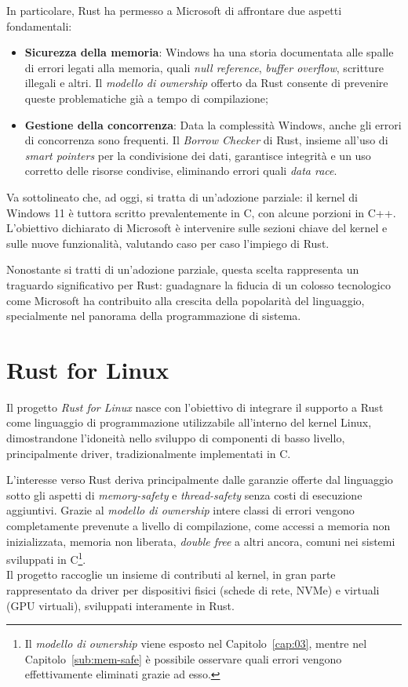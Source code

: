 In particolare, Rust ha permesso a Microsoft di affrontare due aspetti fondamentali:
\begin{itemize}
    \item \textbf{Sicurezza della memoria}: Windows ha una storia documentata alle spalle di errori legati alla memoria, quali \textit{null reference}, \textit{buffer overflow}, scritture illegali e altri. Il \textit{modello di ownership} offerto da Rust consente di prevenire queste problematiche già a tempo di compilazione;
    \item \textbf{Gestione della concorrenza}: Data la complessità Windows, anche gli errori di concorrenza sono frequenti. Il \textit{Borrow Checker} di Rust, insieme all'uso di \textit{smart pointers} per la condivisione dei dati, garantisce integrità e un uso corretto delle risorse condivise, eliminando errori quali \textit{data race}.
\end{itemize}
Va sottolineato che, ad oggi, si tratta di un'adozione parziale: il kernel di Windows 11 è tuttora scritto prevalentemente in C, con alcune porzioni in C++.
L'obiettivo dichiarato di Microsoft è intervenire sulle sezioni chiave del kernel e sulle nuove funzionalità, valutando caso per caso l'impiego di Rust.

Nonostante si tratti di un'adozione parziale, questa scelta rappresenta un traguardo significativo per Rust: guadagnare la fiducia
di un colosso tecnologico come Microsoft ha contribuito alla crescita della popolarità del linguaggio, specialmente nel panorama della programmazione di sistema.

\section{Rust for Linux}
Il progetto \textit{Rust for Linux} nasce con l'obiettivo di integrare il supporto a Rust 
come linguaggio di programmazione utilizzabile all'interno del kernel Linux, dimostrandone l'idoneità nello 
sviluppo di componenti di basso livello, principalmente driver, tradizionalmente 
implementati in C.

L'interesse verso Rust deriva principalmente dalle garanzie offerte dal linguaggio sotto gli aspetti di \textit{memory-safety} e \textit{thread-safety} senza
costi di esecuzione aggiuntivi. Grazie al \textit{modello di ownership} intere classi di errori vengono completamente prevenute a livello di compilazione,
come accessi a memoria non inizializzata, memoria non liberata, \textit{double free} a altri ancora, comuni nei sistemi sviluppati in C\footnote{Il \textit{modello di ownership} viene 
esposto nel Capitolo~\ref{cap:03}, mentre nel Capitolo~\ref{sub:mem-safe} è possibile osservare quali errori vengono effettivamente 
eliminati grazie ad esso.}. \hfill 
\vspace{7pt} \\
\noindent Il progetto raccoglie un insieme di contributi al kernel, in gran parte rappresentato da driver per dispositivi fisici
(schede di rete, NVMe) e virtuali (GPU virtuali), sviluppati interamente in Rust.

